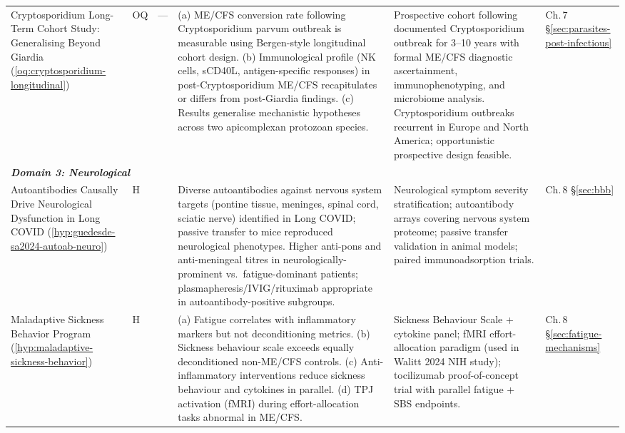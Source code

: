 \begin{longtable}{%
  p{3.0cm}
  >{\centering\arraybackslash}p{0.55cm}
  >{\centering\arraybackslash}p{1.0cm}
  p{3.8cm}
  p{3.8cm}
  p{2.2cm}
}
Cryptosporidium Long-Term Cohort Study: Generalising Beyond Giardia
(\ref{oq:cryptosporidium-longitudinal})
&
OQ & ---
&
(a) ME/CFS conversion rate following Cryptosporidium parvum outbreak is
measurable using Bergen-style longitudinal cohort design.
(b) Immunological profile (NK cells, sCD40L, antigen-specific responses)
in post-Cryptosporidium ME/CFS recapitulates or differs from post-Giardia findings.
(c) Results generalise mechanistic hypotheses across two apicomplexan
protozoan species.
&
Prospective cohort following documented Cryptosporidium outbreak for 3--10 years
with formal ME/CFS diagnostic ascertainment, immunophenotyping, and
microbiome analysis. Cryptosporidium outbreaks recurrent in Europe and North
America; opportunistic prospective design feasible.
&
Ch.\,7 \S\ref{sec:parasites-post-infectious} \\[6pt]

\multicolumn{6}{l}{\small\textit{\textbf{Domain 3: Neurological}}} \\[2pt]

Autoantibodies Causally Drive Neurological Dysfunction in Long COVID
(\ref{hyp:guedesde-sa2024-autoab-neuro})
&
H & 0.60
&
Diverse autoantibodies against nervous system targets (pontine tissue, meninges,
spinal cord, sciatic nerve) identified in Long COVID; passive transfer to mice
reproduced neurological phenotypes.
Higher anti-pons and anti-meningeal titres in neurologically-prominent vs.\
fatigue-dominant patients; plasmapheresis/IVIG/rituximab appropriate in
autoantibody-positive subgroups.
&
Neurological symptom severity stratification; autoantibody arrays covering
nervous system proteome;
passive transfer validation in animal models; paired immunoadsorption trials.
&
Ch.\,8 \S\ref{sec:bbb} \\[6pt]

Maladaptive Sickness Behavior Program
(\ref{hyp:maladaptive-sickness-behavior})
&
H & 0.50
&
(a) Fatigue correlates with inflammatory markers but not deconditioning metrics.
(b) Sickness behaviour scale exceeds equally deconditioned non-ME/CFS controls.
(c) Anti-inflammatory interventions reduce sickness behaviour and cytokines in
parallel.
(d) TPJ activation (fMRI) during effort-allocation tasks abnormal in ME/CFS.
&
Sickness Behaviour Scale + cytokine panel;
fMRI effort-allocation paradigm (used in Walitt 2024 NIH study);
tocilizumab proof-of-concept trial with parallel fatigue + SBS endpoints.
&
Ch.\,8 \S\ref{sec:fatigue-mechanisms} \\[6pt]


\end{longtable}
